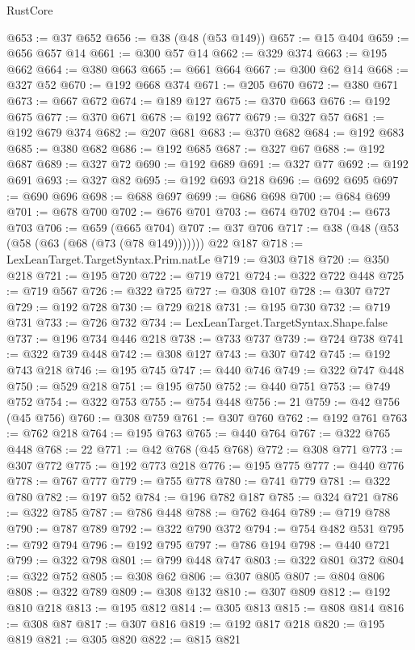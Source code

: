 \begin{lexlean}{RustCore}
\begin{coremodule}
@653 := @37 @652
@656 := @38 (@48 (@53 @149))
@657 := @15 @404
@659 := @656 @657 @14
@661 := @300 @57 @14
@662 := @329 @374
@663 := @195 @662
@664 := @380 @663
@665 := @661 @664
@667 := @300 @62 @14
@668 := @327 @52
@670 := @192 @668 @374
@671 := @205 @670
@672 := @380 @671
@673 := @667 @672
@674 := @189 @127
@675 := @370 @663
@676 := @192 @675
@677 := @370 @671
@678 := @192 @677
@679 := @327 @57
@681 := @192 @679 @374
@682 := @207 @681
@683 := @370 @682
@684 := @192 @683
@685 := @380 @682
@686 := @192 @685
@687 := @327 @67
@688 := @192 @687
@689 := @327 @72
@690 := @192 @689
@691 := @327 @77
@692 := @192 @691
@693 := @327 @82
@695 := @192 @693 @218
@696 := @692 @695
@697 := @690 @696
@698 := @688 @697
@699 := @686 @698
@700 := @684 @699
@701 := @678 @700
@702 := @676 @701
@703 := @674 @702
@704 := @673 @703
@706 := @659 (@665 @704)
@707 := @37 @706
@717 := @38 (@48 (@53 (@58 (@63 (@68 (@73 (@78 @149))))))) @22 @187
@718 := LexLeanTarget.TargetSyntax.Prim.natLe
@719 := @303 @718
@720 := @350 @218
@721 := @195 @720
@722 := @719 @721
@724 := @322 @722 @448
@725 := @719 @567
@726 := @322 @725
@727 := @308 @107
@728 := @307 @727
@729 := @192 @728
@730 := @729 @218
@731 := @195 @730
@732 := @719 @731
@733 := @726 @732
@734 := LexLeanTarget.TargetSyntax.Shape.false
@737 := @196 @734 @446 @218
@738 := @733 @737
@739 := @724 @738
@741 := @322 @739 @448
@742 := @308 @127
@743 := @307 @742
@745 := @192 @743 @218
@746 := @195 @745
@747 := @440 @746
@749 := @322 @747 @448
@750 := @529 @218
@751 := @195 @750
@752 := @440 @751
@753 := @749 @752
@754 := @322 @753
@755 := @754 @448
@756 := 21
@759 := @42 @756 (@45 @756)
@760 := @308 @759
@761 := @307 @760
@762 := @192 @761
@763 := @762 @218
@764 := @195 @763
@765 := @440 @764
@767 := @322 @765 @448
@768 := 22
@771 := @42 @768 (@45 @768)
@772 := @308 @771
@773 := @307 @772
@775 := @192 @773 @218
@776 := @195 @775
@777 := @440 @776
@778 := @767 @777
@779 := @755 @778
@780 := @741 @779
@781 := @322 @780
@782 := @197 @52
@784 := @196 @782 @187
@785 := @324 @721
@786 := @322 @785
@787 := @786 @448
@788 := @762 @464
@789 := @719 @788
@790 := @787 @789
@792 := @322 @790 @372
@794 := @754 @482 @531
@795 := @792 @794
@796 := @192 @795
@797 := @786 @194
@798 := @440 @721
@799 := @322 @798
@801 := @799 @448 @747
@803 := @322 @801 @372
@804 := @322 @752
@805 := @308 @62
@806 := @307 @805
@807 := @804 @806
@808 := @322 @789
@809 := @308 @132
@810 := @307 @809
@812 := @192 @810 @218
@813 := @195 @812
@814 := @305 @813
@815 := @808 @814
@816 := @308 @87
@817 := @307 @816
@819 := @192 @817 @218
@820 := @195 @819
@821 := @305 @820
@822 := @815 @821

\end{coremodule}
\end{lexlean}
